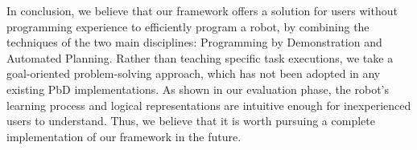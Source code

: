In conclusion, we believe that our framework offers a solution for users without programming experience to efficiently program a robot, by combining the techniques of the two main disciplines: Programming by Demonstration and Automated Planning.
Rather than teaching specific task executions, we take a goal-oriented problem-solving approach, which has not been adopted in any existing PbD implementations.
As shown in our evaluation phase, the robot's learning process and logical representations are intuitive enough for inexperienced users to understand.
Thus, we believe that it is worth pursuing a complete implementation of our framework in the future.

